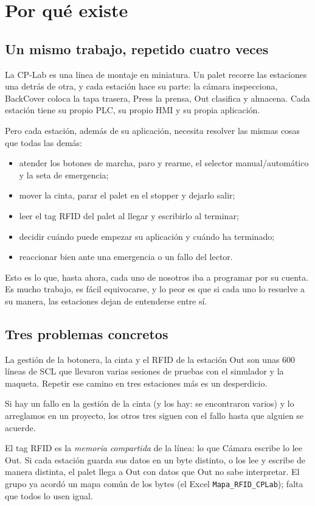 \chapter{Por qué existe \lib}\label{cap:porque}

\section{Un mismo trabajo, repetido cuatro veces}
La CP-Lab es una línea de montaje en miniatura. Un palet recorre las estaciones una detrás de otra, y cada estación hace su parte: la cámara inspecciona, BackCover coloca la tapa trasera, Press la prensa, Out clasifica y almacena. Cada estación tiene su propio PLC, su propio HMI y su propia aplicación.

Pero cada estación, además de su aplicación, necesita resolver las mismas cosas que todas las demás:

\begin{itemize}
\item atender los botones de marcha, paro y rearme, el selector manual/automático y la seta de emergencia;
\item mover la cinta, parar el palet en el stopper y dejarlo salir;
\item leer el tag RFID del palet al llegar y escribirlo al terminar;
\item decidir cuándo puede empezar su aplicación y cuándo ha terminado;
\item reaccionar bien ante una emergencia o un fallo del lector.
\end{itemize}

Esto es lo que, hasta ahora, cada uno de nosotros iba a programar por su cuenta. Es mucho trabajo, es fácil equivocarse, y lo peor es que si cada uno lo resuelve a su manera, las estaciones dejan de entenderse entre sí.

\section{Tres problemas concretos}
\begin{description}[style=nextline,leftmargin=1.2cm]
\item[Tiempo perdido.] La gestión de la botonera, la cinta y el RFID de la estación Out son unas 600 líneas de SCL que llevaron varias sesiones de pruebas con el simulador y la maqueta. Repetir ese camino en tres estaciones más es un desperdicio.
\item[Errores repetidos.] Si hay un fallo en la gestión de la cinta (y los hay: se encontraron varios) y lo arreglamos en un proyecto, los otros tres siguen con el fallo hasta que alguien se acuerde.
\item[Un palet que no se entiende.] El tag RFID es la \emph{memoria compartida} de la línea: lo que Cámara escribe lo lee Out. Si cada estación guarda sus datos en un byte distinto, o los lee y escribe de manera distinta, el palet llega a Out con datos que Out no sabe interpretar. El grupo ya acordó un mapa común de los bytes (el Excel \texttt{Mapa\_RFID\_CPLab}); falta que todos lo usen igual.
\end{description}

